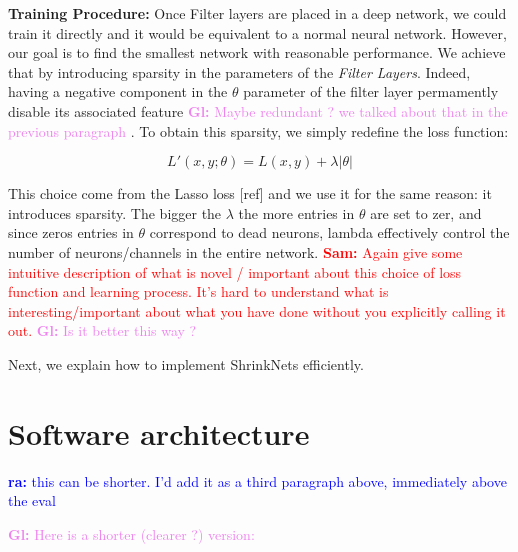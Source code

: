\documentclass[sigconf]{acmart}
\newcommand{\srm}[1]{\textcolor{red}{{\bf Sam:} #1}}
\newcommand{\ra}[1]{\textcolor{blue}{{\bf ra:} #1}}
\newcommand{\gl}[1]{\textcolor{violet}{{\bf Gl:} #1}}
\begin{document}
\textbf{Training Procedure: } Once Filter layers are placed in a deep network, 
we could train it directly and it
would be equivalent to a normal neural network. However, our goal is to find the
smallest network with reasonable performance. We achieve that by introducing
sparsity in the parameters of the \textit{Filter Layers}. Indeed, having a negative component in the $\theta$ parameter of the filter layer permamently disable its associated feature \gl{Maybe redundant ? we talked about that in the previous paragraph}
. To obtain this sparsity, we simply redefine the loss function:

\begin{equation}
  L'(x,y;\theta) = L(x, y) + \lambda|\theta|
\end{equation}

This choice come from the Lasso loss [ref] and we use it for the same reason:
it introduces sparsity. The bigger the $\lambda$ the more entries in $\theta$
are set to zer, and since zeros entries in $\theta$ correspond to dead neurons,
lambda effectively control the number of neurons/channels in the entire
network. \srm{Again give some intuitive description of what is novel /
  important about this choice of loss function and learning process.  It's hard 
  to understand what is interesting/important about what you have done without
  you explicitly calling it out.} \gl{Is it better this way ?}

Next, we explain how to implement ShrinkNets efficiently.

\section{Software architecture}

\ra{this can be shorter. I'd add it as a third paragraph above, immediately
above the eval}

\gl{Here is a shorter (clearer ?) version:}
\end{document}

